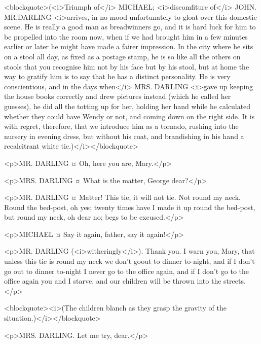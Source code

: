 <blockquote>(<i>Triumph of</i> MICHAEL; <i>discomfiture of</i> JOHN. MR.DARLING <i>arrives, in no mood unfortunately to gloat over this domestic scene. He is really a good man as breadwinners go, and it is hard luck for him to be propelled into the room now, when if we had brought him in a few minutes earlier or later he might have made a fairer impression. In the city where he sits on a stool all day, as fixed as a postage stamp, he is so like all the others on stools that you recognise him not by his face but by his stool, but at home the way to gratify him is to say that he has a distinct personality. He is very conscientious, and in the days when</i> MRS. DARLING <i>gave up keeping the house books correctly and drew pictures instead (which he called her guesses), he did all the totting up for her, holding her hand while he calculated whether they could have Wendy or not, and coming down on the right side. It is with regret, therefore, that we introduce him as a tornado, rushing into the nursery in evening dress, but without his coat, and brandishing in his hand a recalcitrant white tie.)</i></blockquote>

<p>MR. DARLING ¤
Oh, here you are, Mary.</p>

<p>MRS. DARLING ¤
What is the matter, George dear?</p>

<p>MR. DARLING ¤
Matter! This tie, it will not tie.
Not round my neck. Round the bed-post, oh yes; twenty times have I made it up round the bed-post, but round my neck, oh dear no; begs to be excused.</p>

<p>MICHAEL ¤
Say it again, father, say it again!</p>

<p>MR. DARLING (<i>witheringly</i>). Thank you.
I warn you, Mary, that unless this tie is round my neck we don't goout to dinner to-night, and if I don't go out to dinner to-night I never go to the office again, and if I don't go to the office again you and I starve, and our children will be thrown into the streets.</p>

<blockquote><i>(The children blanch as they grasp the gravity of the situation.)</i></blockquote>

<p>MRS. DARLING. Let me try, dear.</p>

